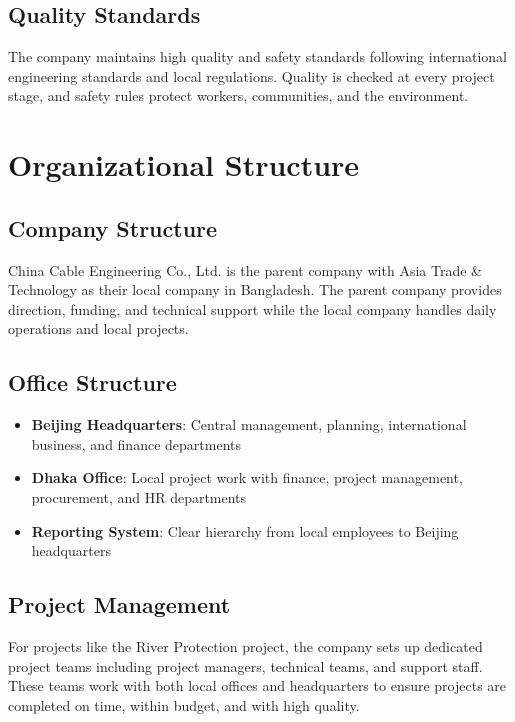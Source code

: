 \vspace{0.3em}
\subsection{Quality Standards}
The company maintains high quality and safety standards following international engineering standards and local regulations. Quality is checked at every project stage, and safety rules protect workers, communities, and the environment.

\vspace{0.5em}
\section{Organizational Structure}

\subsection{Company Structure}
China Cable Engineering Co., Ltd. is the parent company with Asia Trade \& Technology as their local company in Bangladesh. The parent company provides direction, funding, and technical support while the local company handles daily operations and local projects.

\subsection{Office Structure}
\begin{itemize}[leftmargin=*, itemsep=0.25em]
    \item \textbf{Beijing Headquarters}: Central management, planning, international business, and finance departments
    \item \textbf{Dhaka Office}: Local project work with finance, project management, procurement, and HR departments
    \item \textbf{Reporting System}: Clear hierarchy from local employees to Beijing headquarters
\end{itemize}

\subsection{Project Management}
For projects like the River Protection project, the company sets up dedicated project teams including project managers, technical teams, and support staff. These teams work with both local offices and headquarters to ensure projects are completed on time, within budget, and with high quality.

